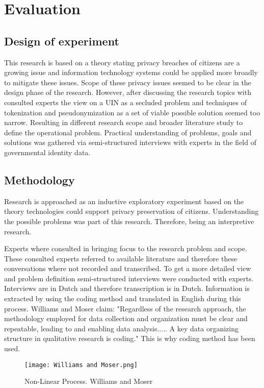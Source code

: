 \chapter{Evaluation}\label{s:evaluation}

\section{Design of experiment}
This research is based on a theory stating privacy breaches of citizens are a growing issue and information technology systems could be applied more broadly to mitigate these issues. Scope of these privacy issues seemed to be clear in the design phase of the research. However, after discussing the research topics with consulted experts the view on a UIN as a secluded problem and techniques of tokenization and pseudonymization as a set of viable possible solution seemed too narrow. Resulting in different research scope and broader literature study to define the operational problem. Practical understanding of problems, goals and solutions was gathered via semi-structured interviews with experts in the field of governmental identity data.

\section{Methodology}
Research is approached as an inductive exploratory experiment based on the theory technologies could support privacy preservation of citizens. Understanding the possible problems was part of this research. Therefore, being an interpretive research.

Experts where consulted in bringing focus to the research problem and scope. These consulted experts referred to available literature and therefore these conversations where not recorded and transcribed. To get a more detailed view and problem definition semi-structured interviews were conducted with experts. Interviews are in Dutch and therefore transcription is in Dutch. Information is extracted by using the coding method and translated in English during this process. Williams and Moser \cite{Williams2019TheAO} claim: "Regardless of the research approach, the methodology employed for data collection and
organization must be clear and repeatable, leading to and enabling data analysis..... A key data organizing structure in qualitative research is coding." This is why coding method has been used. 

    \begin{figure}
        \graphicspath{ {./images/} }
        \centering
        \texttt{[image: Williams and Moser.png]}\\
        \caption{Non-Linear Process. Williams and Moser \cite{Williams2019TheAO}}
        \label{fig:WM2019}
    \end{figure}

